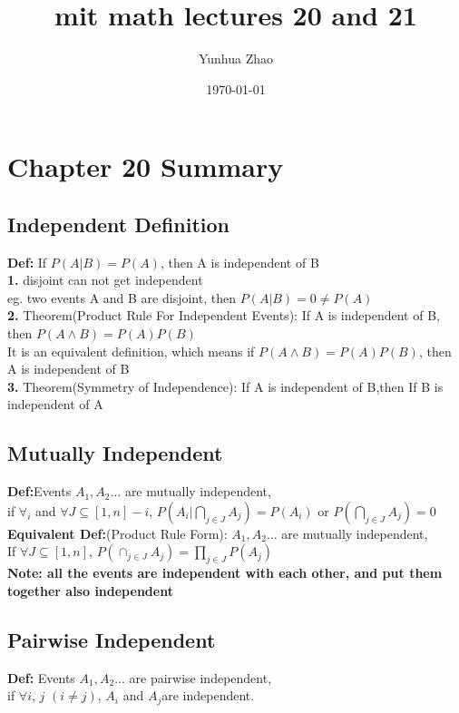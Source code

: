 \documentclass{article}
\title{mit math lectures 20 and 21}
\author{Yunhua Zhao}
\date{\today}
\begin{document}
\maketitle

\section{Chapter 20 Summary} 
\subsection{Independent Definition}
\textbf{Def:} If $P(A|B)=P(A)$, then A is independent of B   \\

\textbf{1.} disjoint can not get independent  \\
   eg. two events A and B are disjoint, then $P(A|B)=0\neq P(A)$ \\
   
\textbf{2.}  Theorem(Product Rule For Independent Events): If A is independent of B, then $P(A\wedge B)=P(A)P(B)$ \\
   It is an equivalent definition, which means if $P(A\wedge B)=P(A)P(B)$, then A is independent of B \\
   
\textbf{3.}  Theorem(Symmetry of Independence):  If A is independent of B,then  If B is independent of A  \\
\subsection{Mutually Independent}
\textbf{Def:}Events $A_1, A_2...$ are mutually independent,   \\
if $\forall_i$ and $\forall J \subseteq[1,n]-{i} $, $P(A_i|\bigcap_{j\in J} A_j)=P(A_i)$ or $P(\bigcap_{j\in J} A_j) = 0$  \\
\textbf{Equivalent Def:}(Product Rule Form):  $A_1, A_2...$ are mutually independent,  \\
If $\forall J\subseteq[1,n]$, $P(\cap_{j\in J}A_j)=\prod_{j\in J} P(A_j)$  \\

\textbf{Note: all the events are independent with each other, and put them together also independent} \\
\subsection{Pairwise Independent}
\textbf{Def:} Events $A_1, A_2...$ are pairwise independent, \\
if $\forall i$, $j$ $(i\neq j)$, $A_i$ and $A_j$are independent. \\
\end{document}
